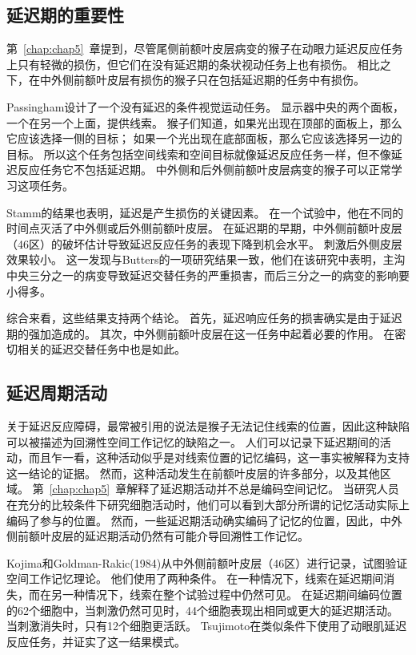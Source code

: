 \subsection{延迟期的重要性}

第~\ref{chap:chap5}~章提到，尽管尾侧前额叶皮层病变的猴子在动眼力延迟反应任务上只有轻微的损伤，但它们在没有延迟期的条状视动任务上也有损伤。
相比之下，在中外侧前额叶皮层有损伤的猴子只在包括延迟期的任务中有损伤。


Passingham\cite{passingham1985memory}设计了一个没有延迟的条件视觉运动任务。
显示器中央的两个面板，一个在另一个上面，提供线索。
猴子们知道，如果光出现在顶部的面板上，那么它应该选择一侧的目标；
如果一个光出现在底部面板，那么它应该选择另一边的目标。
所以这个任务包括空间线索和空间目标就像延迟反应任务一样，但不像延迟反应任务它不包括延迟期。
中外侧和后外侧前额叶皮层病变的猴子可以正常学习这项任务。


Stamm\cite{stamm1969electrical}的结果也表明，延迟是产生损伤的关键因素。
在一个试验中，他在不同的时间点灭活了中外侧或后外侧前额叶皮层。
在延迟期的早期，中外侧前额叶皮层（46区）的破坏估计导致延迟反应任务的表现下降到机会水平。
刺激后外侧皮层效果较小。
这一发现与Butters\cite{butters1969retention}的一项研究结果一致，他们在该研究中表明，主沟中央三分之一的病变导致延迟交替任务的严重损害，而后三分之一的病变的影响要小得多。


综合来看，这些结果支持两个结论。
首先，延迟响应任务的损害确实是由于延迟期的强加造成的。
其次，中外侧前额叶皮层在这一任务中起着必要的作用。
在密切相关的延迟交替任务中也是如此。



\subsection{延迟周期活动}

关于延迟反应障碍，最常被引用的说法是猴子无法记住线索的位置，因此这种缺陷可以被描述为回溯性空间工作记忆的缺陷之一。
人们可以记录下延迟期间的活动，而且乍一看，这种活动似乎是对线索位置的记忆编码，这一事实被解释为支持这一结论的证据。
然而，这种活动发生在前额叶皮层的许多部分，以及其他区域。
第~\ref{chap:chap5}~章解释了延迟期活动并不总是编码空间记忆。
当研究人员在充分的比较条件下研究细胞活动时，他们可以看到大部分所谓的记忆活动实际上编码了参与的位置。
然而，一些延迟期活动确实编码了记忆的位置，因此，中外侧前额叶皮层的延迟期活动仍然有可能介导回溯性工作记忆。


Kojima和Goldman-Rakic(1984)从中外侧前额叶皮层（46区）进行记录，试图验证空间工作记忆理论。
他们使用了两种条件。
在一种情况下，线索在延迟期间消失，而在另一种情况下，线索在整个试验过程中仍然可见。
在延迟期间编码位置的62个细胞中，当刺激仍然可见时，44个细胞表现出相同或更大的延迟期活动。
当刺激消失时，只有12个细胞更活跃。
Tsujimoto\cite{tsujimoto2004properties}在类似条件下使用了动眼肌延迟反应任务，并证实了这一结果模式。


